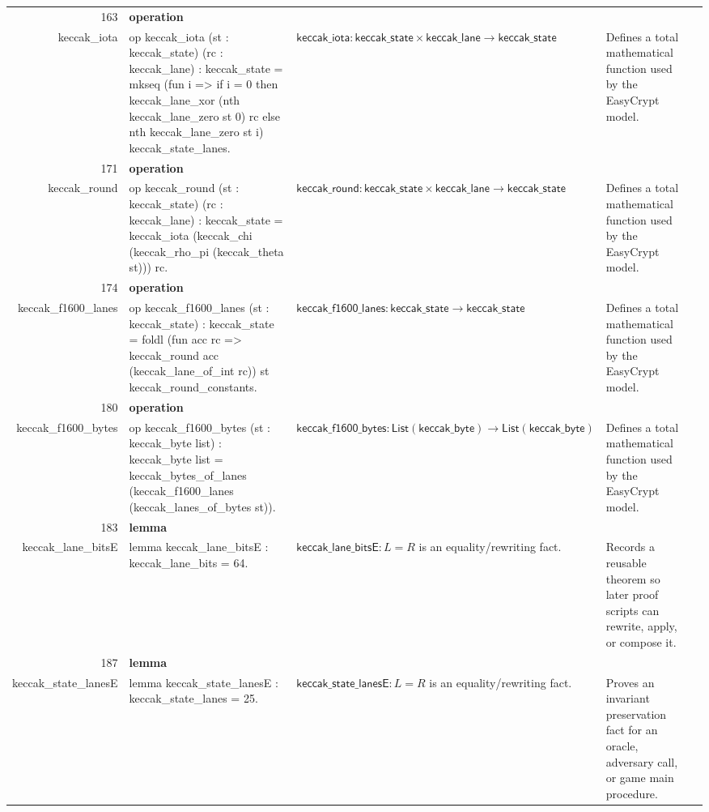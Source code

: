 \documentclass[10pt]{article}
\newcommand{\ec}[1]{\begingroup\ttfamily\scriptsize #1\endgroup}
\begin{document}
\begin{longtable}{r L{0.17\textwidth} L{0.26\textwidth} L{0.27\textwidth} L{0.20\textwidth}}
163 & \textbf{operation}\\\ec{keccak\_iota} & \ec{op keccak\_iota (st : keccak\_state) (rc : keccak\_lane) : keccak\_state = mkseq (fun i => if i = 0 then keccak\_lane\_xor (nth keccak\_lane\_zero st 0) rc else nth keccak\_lane\_zero st i) keccak\_state\_lanes.} & \(\mathsf{keccak\_iota} : \mathsf{keccak\_state} \times \mathsf{keccak\_lane} \to \mathsf{keccak\_state}\) & Defines a total mathematical function used by the EasyCrypt model. \\
171 & \textbf{operation}\\\ec{keccak\_round} & \ec{op keccak\_round (st : keccak\_state) (rc : keccak\_lane) : keccak\_state = keccak\_iota (keccak\_chi (keccak\_rho\_pi (keccak\_theta st))) rc.} & \(\mathsf{keccak\_round} : \mathsf{keccak\_state} \times \mathsf{keccak\_lane} \to \mathsf{keccak\_state}\) & Defines a total mathematical function used by the EasyCrypt model. \\
174 & \textbf{operation}\\\ec{keccak\_f1600\_lanes} & \ec{op keccak\_f1600\_lanes (st : keccak\_state) : keccak\_state = foldl (fun acc rc => keccak\_round acc (keccak\_lane\_of\_int rc)) st keccak\_round\_constants.} & \(\mathsf{keccak\_f1600\_lanes} : \mathsf{keccak\_state} \to \mathsf{keccak\_state}\) & Defines a total mathematical function used by the EasyCrypt model. \\
180 & \textbf{operation}\\\ec{keccak\_f1600\_bytes} & \ec{op keccak\_f1600\_bytes (st : keccak\_byte list) : keccak\_byte list = keccak\_bytes\_of\_lanes (keccak\_f1600\_lanes (keccak\_lanes\_of\_bytes st)).} & \(\mathsf{keccak\_f1600\_bytes} : \mathsf{List}(\mathsf{keccak\_byte}) \to \mathsf{List}(\mathsf{keccak\_byte})\) & Defines a total mathematical function used by the EasyCrypt model. \\
183 & \textbf{lemma}\\\ec{keccak\_lane\_bitsE} & \ec{lemma keccak\_lane\_bitsE : keccak\_lane\_bits = 64.} & \(\mathsf{keccak\_lane\_bitsE} : L = R\) is an equality/rewriting fact. & Records a reusable theorem so later proof scripts can rewrite, apply, or compose it. \\
187 & \textbf{lemma}\\\ec{keccak\_state\_lanesE} & \ec{lemma keccak\_state\_lanesE : keccak\_state\_lanes = 25.} & \(\mathsf{keccak\_state\_lanesE} : L = R\) is an equality/rewriting fact. & Proves an invariant preservation fact for an oracle, adversary call, or game main procedure. \\

\end{longtable}
\end{document}
